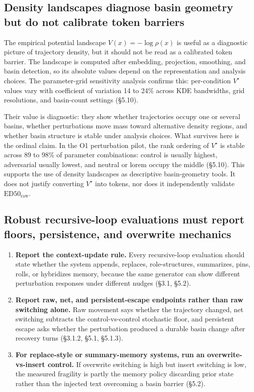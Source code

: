 \documentclass{article}
\theoremstyle{plain}
\theoremstyle{definition}
\begin{document}
\subsection{Density landscapes diagnose basin geometry but do not calibrate token barriers}

The empirical potential landscape \(V(x) = -\log \rho(x)\) is useful as a diagnostic picture of trajectory density, but it should not be read as a calibrated token barrier. The landscape is computed after embedding, projection, smoothing, and basin detection, so its absolute values depend on the representation and analysis choices. The parameter-grid sensitivity analysis confirms this: per-condition \(V^\star\) values vary with coefficient of variation 14 to 24\% across KDE bandwidths, grid resolutions, and basin-count settings (§5.10).

Their value is diagnostic: they show whether trajectories occupy one or several basins, whether perturbations move mass toward alternative density regions, and whether basin structure is stable under analysis choices. What survives here is the ordinal claim. In the O1 perturbation pilot, the rank ordering of \(V^\star\) is stable across 89 to 98\% of parameter combinations: control is usually highest, adversarial usually lowest, and neutral or lorem occupy the middle (§5.10). This supports the use of density landscapes as descriptive basin-geometry tools. It does not justify converting \(V^\star\) into tokens, nor does it independently validate \(\mathrm{ED50}_{\mathrm{raw}}\).

\subsection{Robust recursive-loop evaluations must report floors, persistence, and overwrite mechanics}

\begin{enumerate}
  \item \textbf{Report the context-update rule.} Every recursive-loop evaluation should state whether the system appends, replaces, role-structures, summarizes, pins, rolls, or hybridizes memory, because the same generator can show different perturbation responses under different nudges (§3.1, §5.2).

  \item \textbf{Report raw, net, and persistent-escape endpoints rather than raw switching alone.} Raw movement says whether the trajectory changed, net switching subtracts the control-vs-control stochastic floor, and persistent escape asks whether the perturbation produced a durable basin change after recovery turns (§3.1.2, §5.1, §5.1.3).

  \item \textbf{For replace-style or summary-memory systems, run an overwrite-vs-insert control.} If overwrite switching is high but insert switching is low, the measured fragility is partly the memory policy discarding prior state rather than the injected text overcoming a basin barrier (§5.2).
\end{enumerate}
\end{document}
